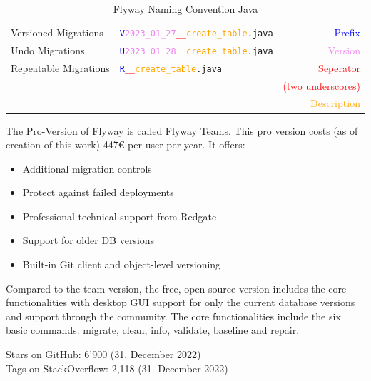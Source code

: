 \begin{table}[H]
\begin{tabularx}{11cm}{l l r}
	Versioned Migrations & \texttt{\textcolor{blue}{V}\textcolor{violet}{2023\_01\_27}\textcolor{red}{\_\_}\textcolor{orange}{create\_table}.java} & \textcolor{blue}{Prefix}\\
	Undo Migrations &  \texttt{\textcolor{blue}{U}\textcolor{violet}{2023\_01\_28}\textcolor{red}{\_\_}\textcolor{orange}{create\_table}.java} & \textcolor{violet}{Version}\\
	Repeatable Migrations & \texttt{\textcolor{blue}{R}\textcolor{red}{\_\_}\textcolor{orange}{create\_table}.java} &  \textcolor{red}{Seperator} \\
	& & \textcolor{red}{(two underscores)}\\
	& & \textcolor{orange}{Description}\\
	
\end{tabularx}
	\caption{Flyway Naming Convention Java}
\label{tab:naming_convention_flyway_java}
\end{table}


%
The Pro-Version of Flyway is called Flyway Teams. This pro version costs (as of creation of this work) 447€ per user per year. It offers:
\begin{itemize}
	\item Additional migration controls
	\item Protect against failed deployments
	\item Professional technical support from Redgate
	\item Support for older DB versions
	\item Built-in Git client and object-level versioning
\end{itemize}

Compared to the team version, the free, open-source version includes the core functionalities with desktop \gls{GUI} support for only the current database versions and support through the community. The core functionalities include the six basic commands: migrate, clean, info, validate, baseline and repair.

%
Stars on GitHub: 6'900 (31. December 2022)\\
Tags on StackOverflow: 2,118 (31. December 2022)\\

